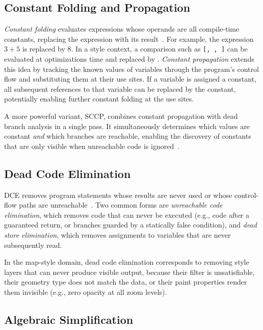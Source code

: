 \subsection{Constant Folding and Propagation}

\emph{Constant folding} evaluates expressions whose operands are all compile-time constants, replacing the expression with its result~\cite{ahoCompilersPrinciplesTechniques2007}.
For example, the expression $3 + 5$ is replaced by $8$.
In a style context, a comparison such as \texttt{[,~,~]} can be evaluated at optimizations time and replaced by .
\emph{Constant propagation} extends this idea by tracking the known values of variables through the program's control flow and substituting them at their use sites.
If a variable is assigned a constant, all subsequent references to that variable can be replaced by the constant, potentially enabling further constant folding at the use sites.

A more powerful variant, \acf{SCCP}, combines constant propagation with dead branch analysis in a single pass.
It simultaneously determines which values are constant \emph{and} which branches are reachable, enabling the discovery of constants that are only visible when unreachable code is ignored~\cite{wegmanConstantPropagationConditional1991}.

\subsection{Dead Code Elimination}

\acf{DCE} removes program statements whose results are never used or whose control-flow paths are unreachable~\cite{ahoCompilersPrinciplesTechniques2007}.
Two common forms are \emph{unreachable code elimination}, which removes code that can never be executed (e.g., code after a guaranteed return, or branches guarded by a statically false condition), and \emph{dead store elimination}, which removes assignments to variables that are never subsequently read.

In the map-style domain, dead code elimination corresponds to removing style layers that can never produce visible output, because their filter is unsatisfiable, their geometry type does not match the data, or their paint properties render them invisible (e.g., zero opacity at all zoom levels).

\subsection{Algebraic Simplification}

